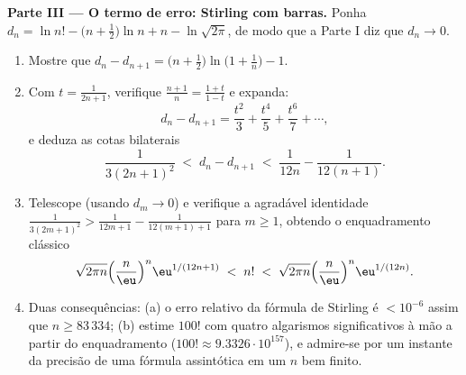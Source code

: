 \begin{problem}
\medskip
\noindent\textbf{Parte III --- O termo de erro: Stirling com barras.}
Ponha $d_n = \ln n! - \bigl(n + \tfrac12\bigr)\ln n + n -
\ln\sqrt{2\pi}$, de modo que a Parte I diz que $d_n \to 0$.
\begin{enumerate}[resume]
  \item Mostre que $d_n - d_{n+1} = \bigl(n +
        \tfrac12\bigr)\ln\bigl(1 + \tfrac1n\bigr) - 1$.
  \item Com $t = \frac1{2n+1}$, verifique $\frac{n+1}n =
        \frac{1+t}{1-t}$ e expanda:
        \[
        d_n - d_{n+1} = \frac{t^2}3 + \frac{t^4}5 +
        \frac{t^6}7 + \cdots,
        \]
        e deduza as cotas bilaterais
        \[
        \frac1{3(2n+1)^2} \;<\; d_n - d_{n+1} \;<\;
        \frac1{12n} - \frac1{12(n+1)} .
        \]
  \item Telescope (usando $d_m \to 0$) e verifique a agradável identidade
         $\frac1{3(2m+1)^2} >
        \frac1{12m+1} - \frac1{12(m+1)+1}$ para $m \geq 1$, obtendo o enquadramento clássico
        \[
        \sqrt{2\pi n}\Bigl(\frac n\eu\Bigr)^n
        \eu^{1/(12n+1)} \;<\; n! \;<\;
        \sqrt{2\pi n}\Bigl(\frac n\eu\Bigr)^n\eu^{1/(12n)} .
        \]
  \item Duas consequências: (a) o erro relativo da fórmula de Stirling
        é $< 10^{-6}$ assim que $n \geq 83\,334$; (b) estime $100!$ com quatro
        algarismos significativos à mão a partir do enquadramento
        ($100! \approx 9.3326\cdot
        10^{157}$), e admire-se por um instante da precisão de uma fórmula
        assintótica em um $n$ bem finito.
\end{enumerate}


\end{problem}
